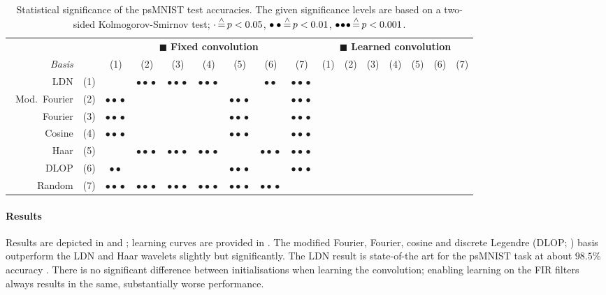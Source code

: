 \begin{table}
	\newcommand{\sigA}{\ensuremath{\cdot}}
	\newcommand{\sigB}{\ensuremath{\bullet\bullet}}
	\newcommand{\sigC}{\ensuremath{\bullet\!\bullet\!\bullet}}
	\caption[Statistical significance of the psMNiST test accuracies]{Statistical significance of the psMNIST test accuracies. The given significance levels are based on a two-sided Kolmogorov-Smirnov test; $\sigA \correspondsTo p < 0.05$, $\sigB \correspondsTo p < 0.01$, $\sigC \correspondsTo p < 0.001$.}
	\label{tbl:psmnist_significance}
	\centering\small\sffamily
	\setlength{\tabcolsep}{6.2pt}
	\begin{tabular}{r r  c c c c c c c  c c c c c c c}
	\toprule
	& & \multicolumn{7}{c}{{\color{skyblue1}$\blacksquare$} \textbf{Fixed convolution}}
	& \multicolumn{7}{c}{{\color{aluminium2}$\blacksquare$} \textbf{Learned convolution}} \\
	\cmidrule(r){3-9}\cmidrule(l){10-16}
	\emph{Basis} & & (1) & (2) & (3) & (4) & (5) & (6) & (7)  & (1) & (2) & (3) & (4) & (5) & (6) & (7) \\
	\midrule
	\symLTI~LDN & (1) &
		 &
		\sigC &
		\sigC &
		\sigC &
		 &
		\sigB &
		\sigC &
		 &
		 &
		 &
		 &
		 &
		 &
		 \\
		\symLTI~Mod.~Fourier & (2) &
		\sigC &
		 &
		 &
		 &
		\sigC &
		 &
		\sigC &
		 &
		 &
		 &
		 &
		 &
		 &
		 \\
		\symSDT~Fourier & (3) &
		\sigC &
		 &
		 &
		 &
		\sigC &
		 &
		\sigC &
		 &
		 &
		 &
		 &
		 &
		 &
		 \\
		\symSDT~Cosine & (4) &
		\sigC &
		 &
		 &
		 &
		\sigC &
		 &
		\sigC &
		 &
		 &
		 &
		 &
		 &
		 &
		 \\
		\symSDT~Haar & (5) &
		 &
		\sigC &
		\sigC &
		\sigC &
		 &
		\sigC &
		\sigC &
		 &
		 &
		 &
		 &
		 &
		 &
		 \\
		\symFIR~DLOP & (6) &
		\sigB &
		 &
		 &
		 &
		\sigC &
		 &
		\sigC &
		 &
		 &
		 &
		 &
		 &
		 &
		 \\
		\symFIR~Random & (7) &
		\sigC &
		\sigC &
		\sigC &
		\sigC &
		\sigC &
		\sigC &
		 &
		 &
		 &
		 &
		 &
		 &
		 &
		 \\
	\bottomrule
	\end{tabular}
\end{table}

\paragraph{Results}
Results are depicted in  and ; learning curves are provided in .
The modified Fourier, Fourier, cosine and discrete Legendre (DLOP; ) basis outperform the LDN and Haar wavelets slightly but significantly.
The LDN result is state-of-the art for the psMNIST task at about $98.5\%$ accuracy \citep{chilkuri2021parallelizing}.
There is no significant difference between initialisations when learning the convolution; enabling learning on the FIR filters always results in the same, substantially worse performance.


